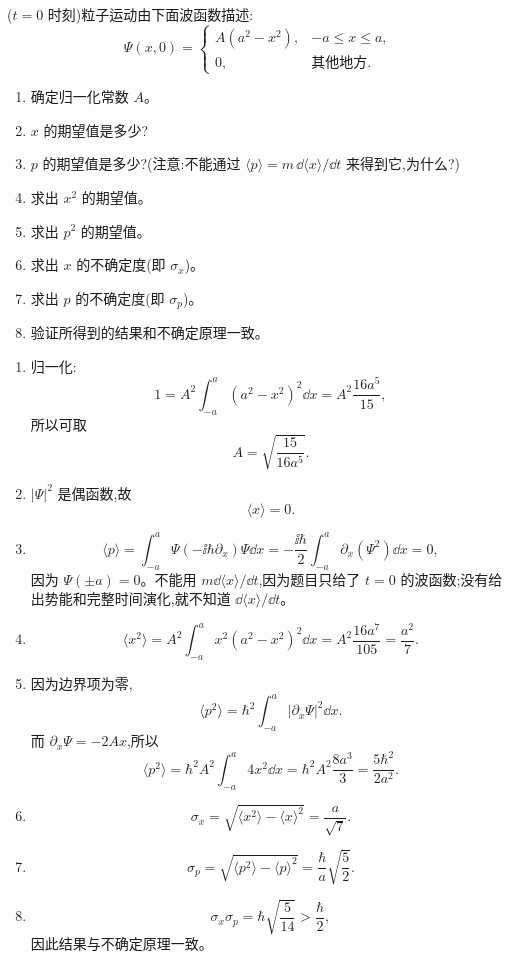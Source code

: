 \begin{question}
($t=0$ 时刻)粒子运动由下面波函数描述:
\[
\Psi(x,0)=
\begin{cases}
A(a^2-x^2), & -a\le x\le a,\\
0, & \text{其他地方}.
\end{cases}
\]
\begin{enumerate}
\item 确定归一化常数 $A$。
\item $x$ 的期望值是多少?
\item $p$ 的期望值是多少?(注意:不能通过 $\langle p\rangle=m\,\dd\langle x\rangle/\dd t$ 来得到它,为什么?)
\item 求出 $x^2$ 的期望值。
\item 求出 $p^2$ 的期望值。
\item 求出 $x$ 的不确定度(即 $\sigma_x$)。
\item 求出 $p$ 的不确定度(即 $\sigma_p$)。
\item 验证所得到的结果和不确定原理一致。
\end{enumerate}
\begin{solution}
\begin{enumerate}
\item 归一化:
\[
1=A^2\int_{-a}^{a}(a^2-x^2)^2\dd x
=A^2\frac{16a^5}{15},
\]
所以可取
\[
A=\sqrt{\frac{15}{16a^5}}.
\]
\item $|\Psi|^2$ 是偶函数,故
\[
\langle x\rangle=0.
\]
\item
\[
\langle p\rangle=\int_{-a}^a\Psi(-\ii\hbar\partial_x)\Psi\dd x
=-\frac{\ii\hbar}{2}\int_{-a}^a\partial_x(\Psi^2)\dd x=0,
\]
因为 $\Psi(\pm a)=0$。不能用 $m\dd\langle x\rangle/\dd t$,因为题目只给了 $t=0$ 的波函数;没有给出势能和完整时间演化,就不知道 $\dd\langle x\rangle/\dd t$。
\item
\[
\langle x^2\rangle=A^2\int_{-a}^{a}x^2(a^2-x^2)^2\dd x
=A^2\frac{16a^7}{105}=\frac{a^2}{7}.
\]
\item 因为边界项为零,
\[
\langle p^2\rangle=\hbar^2\int_{-a}^{a}|\partial_x\Psi|^2\dd x.
\]
而 $\partial_x\Psi=-2Ax$,所以
\[
\langle p^2\rangle=\hbar^2 A^2\int_{-a}^{a}4x^2\dd x
=\hbar^2A^2\frac{8a^3}{3}=\frac{5\hbar^2}{2a^2}.
\]
\item
\[
\sigma_x=\sqrt{\langle x^2\rangle-\langle x\rangle^2}=\frac{a}{\sqrt7}.
\]
\item
\[
\sigma_p=\sqrt{\langle p^2\rangle-\langle p\rangle^2}=\frac{\hbar}{a}\sqrt{\frac52}.
\]
\item
\[
\sigma_x\sigma_p=\hbar\sqrt{\frac{5}{14}}>\frac{\hbar}{2},
\]
因此结果与不确定原理一致。
\end{enumerate}
\end{solution}
\end{question}

